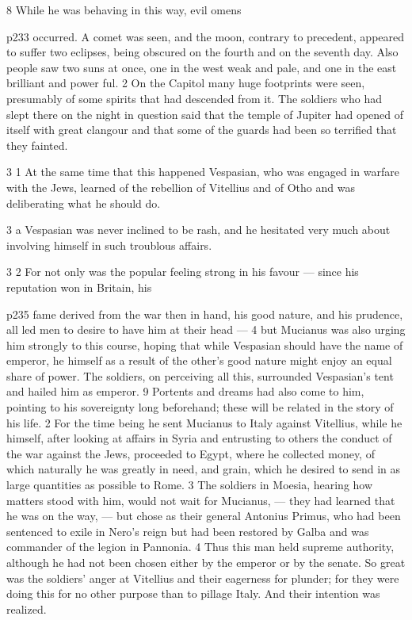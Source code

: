 8
While he was behaving in this way, evil omens

p233 occurred. A comet was seen, and the moon, contrary to precedent, appeared to suffer two eclipses, being obscured on the fourth and on the seventh day. Also people saw two suns at once, one in the west weak and pale, and one in the east brilliant and power ­ful. 2 On the Capitol many huge footprints were seen, presumably of some spirits that had descended from it. The soldiers who had slept there on the night in question said that the temple of Jupiter had opened of itself with great clangour and that some of the guards had been so terrified that they fainted.

3 1 At the same time that this happened Vespasian, who was engaged in warfare with the Jews, learned of the rebellion of Vitellius and of Otho and was deliberating what he should do.

3 a Vespasian was never inclined to be rash, and he hesitated very much about involving himself in such troublous affairs.

3 2 For not only was the popular feeling strong in his favour \texthebrew{—} since his reputation won in Britain, his

p235 fame derived from the war then in hand, his good nature, and his prudence, all led men to desire to have him at their head \texthebrew{—} 4 but Mucianus was also urging him strongly to this course, hoping that while Vespasian should have the name of emperor, he himself as a result of the other's good nature might enjoy an equal share of power. The soldiers, on perceiving all this, surrounded Vespasian's tent and hailed him as emperor. 9 Portents and dreams had also come to him, pointing to his sovereignty long beforehand; these will be related in the story of his life. 2 For the time being he sent Mucianus to Italy against Vitellius, while he himself, after looking at affairs in Syria and entrusting to others the conduct of the war against the Jews, proceeded to Egypt, where he collected money, of which naturally he was greatly in need, and grain, which he desired to send in as large quantities as possible to Rome. 3 The soldiers in Moesia, hearing how matters stood with him, would not wait for Mucianus, \texthebrew{—} they had learned that he was on the way, \texthebrew{—} but chose as their general Antonius Primus, who had been sentenced to exile in Nero's reign but had been restored by Galba and was commander of the legion in Pannonia. 4 Thus this man held supreme authority, although he had not been chosen either by the emperor or by the senate. So great was the soldiers' anger at Vitellius and their eagerness for plunder; for they were doing this for no other purpose than to pillage Italy. And their intention was realized.


